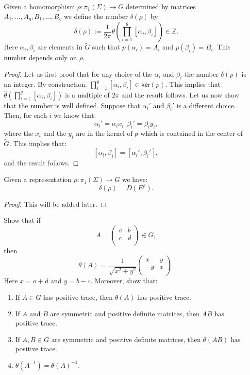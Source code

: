 \begin{lemma}
	Given a homomorphism $\rho: \pi_1(\Sigma) \rightarrow G$ determined by matrices $A_1, \dots, A_g, B_1,\dots, B_g$ we define the number $\delta(\rho)$ by:
	\[ \delta(\rho):= \frac{1}{2\pi}\tilde{\theta}(\prod_{i=1}^g [\alpha_i,\beta_i])\in \mathbb{Z}.\]
	Here $\alpha_i, \beta_i$ are elements in $\tilde{G}$ such that $p(\alpha_i)=A_i$ and $p(\beta_i)=B_i$. This number depends only on $\rho$.
\end{lemma}
\begin{proof}
	Let us first proof that for any choice of the $\alpha_i$ and $\beta_i$ the number $\delta(\rho)$ is an integer. By construction, $\prod_{i=1}^g [\alpha_i,\beta_i] \in \mathsf{ker}(p)$. This implies that $\hat{\theta}(\prod_{i=1}^g [\alpha_i,\beta_i])$ is a multiple of $2\pi$ and the result follows. Let us now show that the number is well defined. Suppose that $\alpha_i'$ and $\beta_i'$ is a different choice. Then, for each $i$ we know that:
	\[ \alpha_i'=\alpha_i x_i\;\, \beta_i'= \beta_i y_i ,\]
	where the $x_i$ and the $y_i$ are in the kernel of $p$ which is contained in the center of $\tilde{G}$. This implies that:
	\[ [\alpha_i, \beta_i]=[\alpha_i',\beta_i'],\]
	and the result follows.
\end{proof}
\begin{lemma}
	Given a representation $\rho: \pi_1(\Sigma) \rightarrow G$ we have:
	\[ \delta(\rho)=D(E^\rho).\]
\end{lemma}

\begin{proof}
	This will be added later.
\end{proof}

\begin{exercise}\label{trace}
	Show that if
	\[A= \left( {\begin{array}{cc}
		a & b\\
		c & d \\
		\end{array} } \right) \in G,\] then 
	\[\theta(A)=\frac{1}{\sqrt{x^{2}+y^{2}} } \left( {\begin{array}{cc}
		x & y\\
		-y &  x \\
		\end{array} } \right). \]
	Here $x=a+d$ and $y=b-c$.
	Moreover, show that:			
	\begin{enumerate}
		\item If $A \in G$ has positive trace, then $\theta(A)$ has positive trace.
		\item If $A$ and $B$ are symmetric and positive definite matrices, then $AB$ has positive trace.
		\item If $A,B \in G$ are symmetric and positive definite matrices, then $\theta(A B)$ has positive trace.
		\item $\theta(A^{-1})=\theta(A)^{-1}$.
	\end{enumerate}
\end{exercise}




